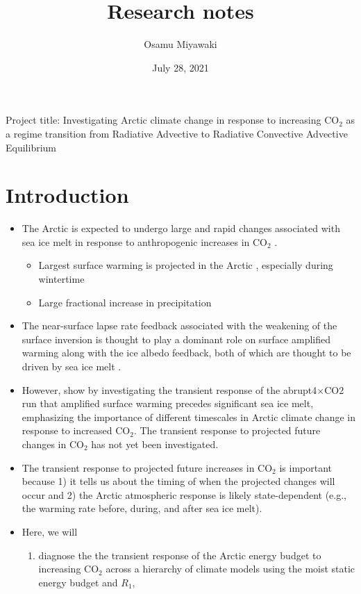 \documentclass{article}
\title{Research notes}
\date{July 28, 2021}
\author{Osamu Miyawaki}
\begin{document}
\maketitle

Project title: Investigating Arctic climate change in response to increasing CO$_2$ as a regime transition from Radiative Advective to Radiative Convective Advective Equilibrium

\section*{Introduction}
\begin{itemize}
    \item The Arctic is expected to undergo large and rapid changes associated with sea ice melt in response to anthropogenic increases in CO$_2$ \citep{dai2019, feldl2020}.
    \begin{itemize}
        \item Largest surface warming is projected in the Arctic \citep[Arctic Amplification, e.g.][]{manabe1975, held1993a}, especially during wintertime
        \item Large fractional increase in precipitation \citep{bintanja2014,siler2018}
    \end{itemize}
    \item The near-surface lapse rate feedback associated with the weakening of the surface inversion is thought to play a dominant role on surface amplified warming \citep{bintanja2011, pithan2014} along with the ice albedo feedback, both of which are thought to be driven by sea ice melt \citep{feldl2020}.
    \item However, \cite{previdi2020} show by investigating the transient response of the abrupt4$\times$CO2 run that amplified surface warming precedes significant sea ice melt, emphasizing the importance of different timescales in Arctic climate change in response to increased CO$_2$. The transient response to projected future changes in CO$_2$ has not yet been investigated.
    \item The transient response to projected future increases in CO$_2$ is important because 1) it tells us about the timing of when the projected changes will occur and 2) the Arctic atmospheric response is likely state-dependent (e.g., the warming rate before, during, and after sea ice melt).
    \item Here, we will
    \begin{enumerate}
        \item diagnose the the transient response of the Arctic energy budget to increasing CO$_2$ across a hierarchy of climate models using the moist static energy budget and $R_1$,

\end{enumerate}
\end{itemize}
\end{document}
